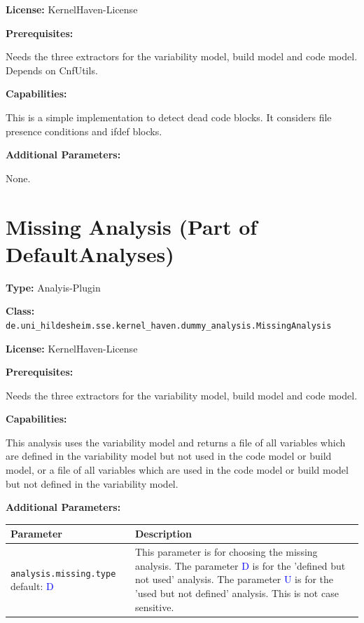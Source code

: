 \textbf{License:} KernelHaven-License

\textbf{Prerequisites:}

Needs the three extractors for the variability model, build model and code model. Depends on CnfUtils.

\textbf{Capabilities:}

This is a simple implementation to detect dead code blocks. It considers file presence conditions and ifdef blocks.

\textbf{Additional Parameters:}

None.

\section{Missing Analysis  (Part of DefaultAnalyses)}

\textbf{Type:}  Analyis-Plugin

\textbf{Class:} \texttt{de.uni\_hildesheim.sse.kernel\_haven.dummy\_analysis.MissingAnalysis}

\textbf{License:} KernelHaven-License

\textbf{Prerequisites:}

Needs the three extractors for the variability model, build model and code model.

\textbf{Capabilities:}

This analysis uses the variability model and returns a file of all variables which are defined in the variability model but not used in the code model or build model, or a file of all variables which are used in the code model or build model but not defined in the variability model.

\textbf{Additional Parameters:}

\begin{table}[h!] %
    \begin{tabularx}{\textwidth}{|p{}|p{}|}\hline
        \textbf{Parameter} & \textbf{Description} \\ \hline \hline
        
        \texttt{analysis.missing.type} \newline default: \textcolor{blue}{D}  \newline & This parameter is for choosing the missing analysis. The parameter \textcolor{blue}{D} is for the 'defined but not used' analysis. The parameter \textcolor{blue}{U} is for the 'used but not defined' analysis.  This is not case sensitive.\\ \hline
        
    \end{tabularx}
\end{table}


